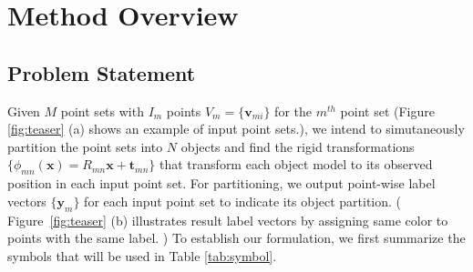 \section{Method Overview}
\label{sec:method}
\subsection{Problem Statement}
Given $M$ point sets with $I_m$ points $V_m=\{\pmb{v}_{mi}\}$ for the $m^{th}$ point set (Figure \ref{fig:teaser} (a) shows an example of input point sets.), we intend to simutaneously partition the point sets into $N$ objects and find the rigid transformations $\{\phi_{mn}(\pmb{x})=R_{mn}\pmb{x}+\pmb{t}_{mn}\}$ that transform each object model to its observed position in each input point set.  For partitioning, we output point-wise label vectors $\{\pmb y_m\}$ for each input point set to indicate its object partition. ( Figure~\ref{fig:teaser} (b) illustrates result label vectors by assigning same color to points with the same label. ) To establish our formulation, we first summarize the symbols that will be used in Table \ref{tab:symbol}.
